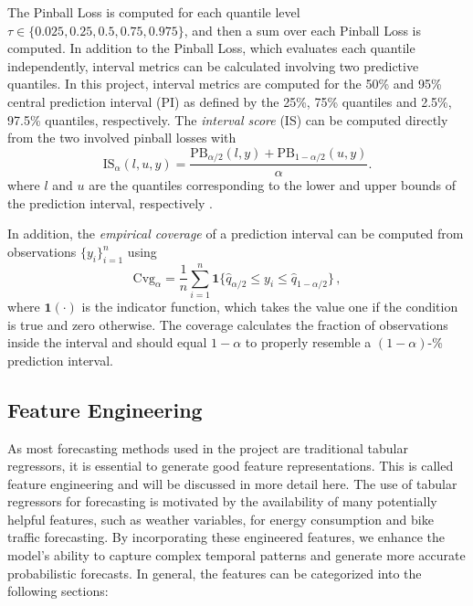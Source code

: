 The Pinball Loss is computed for each quantile level $\tau \in \{0.025, 0.25, 0.5, 0.75, 0.975\}$, and then a sum over each Pinball Loss is computed. In addition to the Pinball Loss, which evaluates each quantile independently, interval metrics can be calculated involving two predictive quantiles. In this project, interval metrics are computed for the 50\% and 95\% central prediction interval (PI) as defined by the 25\%, 75\% quantiles and 2.5\%, 97.5\% quantiles, respectively. The \textit{interval score} (IS) can be computed directly from the two involved pinball losses with
\begin{equation}
\label{eq:IntervalScore}
\text{IS}_{\alpha}(l, u, y) = \frac{\text{PB}_{\alpha/2}(l, y) + \text{PB}_{1-\alpha/2}(u, y)}{\alpha}.
\end{equation}
where $l$ and $u$ are the quantiles corresponding to the lower and upper bounds of the prediction interval, respectively \parencite[370]{gneiting_strictly_2007}. 

In addition, the \textit{empirical coverage} of a prediction interval can be computed from 
observations $\{y_i\}_{i=1}^{n}$ using
\begin{equation}
    \text{Cvg}_{\alpha} = \frac{1}{n} \sum_{i = 1}^{n} \mathbf{1}\{ \hat{q}_{\alpha/2} \leq y_i \leq \hat{q}_{1 - \alpha /2 } \} \,,
\end{equation}
where $\mathbf{1}(\cdot)$ is the indicator function, which takes the value one if the condition is true and zero otherwise.
The coverage calculates the fraction of observations inside the interval and should equal $1 - \alpha$ to properly resemble a $(1 - \alpha)$-\% prediction interval.


\subsection{Feature Engineering}
\label{sec:Methodology:FeatureEngineering}

As most forecasting methods used in the project are traditional tabular regressors, 
it is essential to generate good feature representations. 
This is called feature engineering and will be discussed in more detail here.
The use of tabular regressors for forecasting is motivated by the availability of many potentially helpful features, such as weather variables, for energy consumption and bike traffic forecasting.
By incorporating these engineered features, we enhance the model's ability to 
capture complex temporal patterns and generate more accurate probabilistic forecasts.
In general, the features can be categorized into the following sections:

